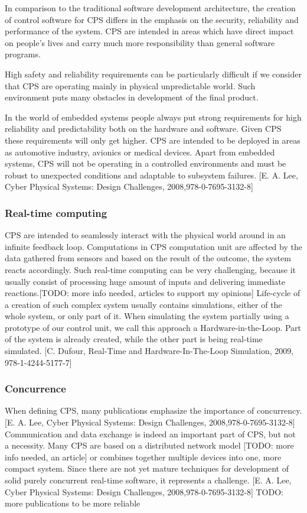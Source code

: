 \documentclass[english,technical,10pt]{FITreport}[2018/01/26]
\begin{document}
In comparison to the traditional software development architecture, the creation of control software for CPS differs in the emphasis on the security, reliability and performance of the system. CPS are intended in areas which have direct impact on people’s lives and carry much more responsibility than general software programs.

High safety and reliability requirements can be particularly difficult if we consider that CPS are operating mainly in physical unpredictable world. Such environment puts many obstacles in development of the final product.

In the world of embedded systems people always put strong requirements for high reliability and predictability both on the hardware and software. Given CPS these requirements will only get higher. CPS are intended to be deployed in areas as automotive industry, avionics or medical devices. Apart from embedded systems, CPS will not be operating in a controlled environments and must be robust to unexpected conditions and adaptable to subsystem failures. [E. A. Lee, Cyber Physical Systems: Design Challenges, 2008,978-0-7695-3132-8]

\subsubsection{Real-time computing}
CPS are intended to seamlessly interact with the physical world around in an infinite feedback loop. Computations in CPS computation unit are affected by the data gathered from sensors and based on the result of the outcome, the system reacts accordingly. Such real-time computing can be very challenging, because it usually consist of processing huge amount of inputs and delivering immediate reactions.[TODO: more info needed, articles to support my opinions] Life-cycle of a creation of such complex system usually contains simulations, either of the whole system, or only part of it. When simulating the system partially using a prototype of our control unit, we call this approach a Hardware-in-the-Loop. Part of the system is already created, while the other part is being real-time simulated. [C. Dufour, Real-Time and Hardware-In-The-Loop Simulation, 2009, 978-1-4244-5177-7]

\subsubsection{Concurrence}

When defining CPS, many publications emphasize the importance of concurrency. [E. A. Lee, Cyber Physical Systems: Design Challenges, 2008,978-0-7695-3132-8] Communication and data exchange is indeed an important part of CPS, but not a necessity. Many CPS are based on a distributed network model [TODO: more info needed, an article] or combines together multiple devices into one, more compact system. Since there are not yet mature techniques for development of solid purely concurrent real-time software, it represents a challenge. [E. A. Lee, Cyber Physical Systems: Design Challenges, 2008,978-0-7695-3132-8]
TODO: more publications to be more reliable
\end{document}
